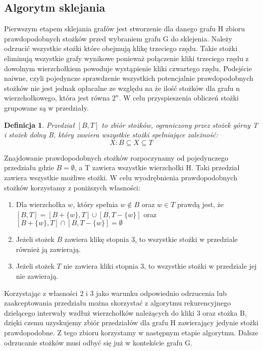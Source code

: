 \documentclass[11pt]{article}
\newtheorem{definition}{Definicja}[section]
\begin{document}
\subsection{Algorytm sklejania}
Pierwszym etapem sklejania grafów jest stworzenie dla danego grafu H zbioru prawdopodobnych stożków przed wybraniem grafu G do sklejenia. Należy odrzucić wszystkie stożki które obejmują klikę trzeciego rzędu. Takie stożki eliminują wszystkie grafy wynikowe ponieważ połączenie kliki trzeciego rzędu z dowolnym wierzchołkiem powoduje wystąpienie kliki czwartego rzędu. Podejście naiwne, czyli pojedyncze sprawdzenie wszystkich potencjalnie prawdopodobnych stożków nie jest jednak opłacalne ze względu na że ilość stożków dla grafu n wierzchołkowego, która jest równa $2^n$. W celu przyspieszenia obliczeń stożki grupowane są w przedziały. 

\begin{definition}
Przedział $[B, T]$ to zbiór stożków, ograniczony przez stożek górny T i stożek dolny B, który zawiera wszystkie stożki spełniające zależność:  $$X: B \subseteq X \subseteq T$$ 
\end{definition}


Znajdowanie prawdopodobnych stożków rozpoczynamy od pojedynczego przedziału gdzie $B = \emptyset$, a T zawiera wszystkie wierzchołki H. Taki przedział zawiera wszystkie możliwe stożki. W celu wyodrębnienia prawdopodobnych stożków korzystamy z poniższych własności:
\begin{enumerate}
\item Dla wierzchołka $w$, który spełnia $w \notin B$ oraz $w\in T$ prawdą jest, że $[B, T] = [B + \{ w\}, T] \cup [B , T - \{ w\}]$ oraz $[B +\{ w\}, T] \cap [B , T - \{ w\}] = \emptyset$

\item Jeżeli stożek $B$ zawiera klikę stopnia 3, to wszystkie stożki w przedziale również ją zawierają. 

\item Jeżeli stożek $T$ nie zawiera kliki stopnia 3, to wszystkie stożki w przedziale jej nie zawierają.
\end{enumerate}

Korzystając z własności 2 i 3 jako warunku odpowiednio odrzucenia lub zaakceptowania przedziału można skorzystać z algorytmu rekurencyjnego dzielącego interwały wzdłuż wierzchołków należących do kliki 3 oraz stożka B, dzięki czemu uzyskujemy zbiór przedziałów dla grafu H zawierający jedynie stożki prawdopodobne. Z tego zbioru korzystamy w następnym etapie algorytmu.
Dalsze odrzucanie stożków musi odbyć się już w kontekście grafu G.
  
\end{document}
